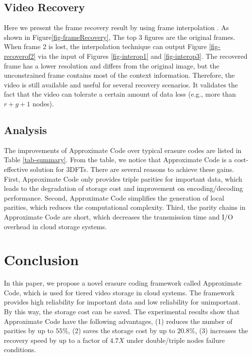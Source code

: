 \documentclass[sigconf]{acmart}
\begin{document}
\subsection{Video Recovery}
Here we present the frame recovery result by using frame interpolation \cite{meyer2015phase, niklaus2018context,van2017frame}. As shown in Figure\ref{fig-frameRecovery}, The top 3 figures are the original frames. When frame 2 is lost, the interpolation technique can output Figure \ref{fig-recoverof2} via the input of Figures \ref{fig-interop1} and \ref{fig-interop3}. The recovered frame has a lower resolution and differs from the original image, but the unconstrained frame contains most of the context information. Therefore, the video is still available and useful for several recovery scenarios. It validates the fact that the video can tolerate a certain amount of data loss (e.g., more than $r+g+1$ nodes).

\subsection{Analysis}
The improvements of Approximate Code over typical erasure codes are listed in Table \ref{tab-summary}. From the table, we notice that Approximate Code is a cost-effective solution for 3DFTs. There are several reasons to achieve these gains. First, Approximate Code only provides triple parities for important data, which leads to the degradation of storage cost and improvement on encoding/decoding performance. Second, Approximate Code simplifies the generation of local parities, which reduces the computational complexity. Third, the parity chains in Approximate Code are short, which decreases the transmission time and I/O overhead in cloud storage systems.

\section{Conclusion}\label{Conclusion}
In this paper, we propose a novel erasure coding framework called Approximate Code, which is used for tiered video storage in cloud systems. The framework provides high reliability for important data and low reliability for unimportant. By this way, the storage cost can be saved. The experimental results show that Approximate Code have the following advantages, (1) reduces the number of parities by up to $55\%$, (2) saves the storage cost by up to $20.8\%$, (3) increases the recovery speed by up to a factor of $4.7X$ under double/triple nodes failure conditions.



\end{document}
